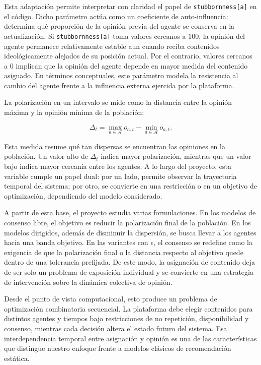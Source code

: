 \documentclass[10pt,letterpaper]{article}
\begin{document}
Esta adaptaci\'on permite interpretar con claridad el papel de \texttt{stubbornness[a]} en el c\'odigo. Dicho par\'ametro act\'ua como un coeficiente de auto-influencia: determina qu\'e proporci\'on de la opini\'on previa del agente se conserva en la actualizaci\'on. Si \texttt{stubbornness[a]} toma valores cercanos a \(100\), la opini\'on del agente permanece relativamente estable aun cuando reciba contenidos ideol\'ogicamente alejados de su posici\'on actual. Por el contrario, valores cercanos a \(0\) implican que la opini\'on del agente depende en mayor medida del contenido asignado. En t\'erminos conceptuales, este par\'ametro modela la resistencia al cambio del agente frente a la influencia externa ejercida por la plataforma.

La polarizaci\'on en un intervalo se mide como la distancia entre la opini\'on m\'axima y la opini\'on m\'inima de la poblaci\'on:

\[
\Delta_t = \max_{a \in \mathcal{A}} o_{a,t} - \min_{a \in \mathcal{A}} o_{a,t}.
\]

Esta medida resume qu\'e tan dispersas se encuentran las opiniones en la poblaci\'on. Un valor alto de \(\Delta_t\) indica mayor polarizaci\'on, mientras que un valor bajo indica mayor cercan\'ia entre los agentes. A lo largo del proyecto, esta variable cumple un papel dual: por un lado, permite observar la trayectoria temporal del sistema; por otro, se convierte en una restricci\'on o en un objetivo de optimizaci\'on, dependiendo del modelo considerado.

A partir de esta base, el proyecto estudia varias formulaciones. En los modelos de consenso libre, el objetivo es reducir la polarizaci\'on final de la poblaci\'on. En los modelos dirigidos, adem\'as de disminuir la dispersi\'on, se busca llevar a los agentes hacia una banda objetivo. En las variantes con \(\epsilon\), el consenso se redefine como la exigencia de que la polarizaci\'on final o la distancia respecto al objetivo quede dentro de una tolerancia prefijada. De este modo, la asignaci\'on de contenido deja de ser solo un problema de exposici\'on individual y se convierte en una estrategia de intervenci\'on sobre la din\'amica colectiva de opini\'on.

Desde el punto de vista computacional, esto produce un problema de optimizaci\'on combinatoria secuencial. La plataforma debe elegir contenidos para distintos agentes y tiempos bajo restricciones de no repetici\'on, disponibilidad y consenso, mientras cada decisi\'on altera el estado futuro del sistema. Esa interdependencia temporal entre asignaci\'on y opini\'on es una de las caracter\'isticas que distingue nuestro enfoque frente a modelos cl\'asicos de recomendaci\'on est\'atica.
\end{document}
